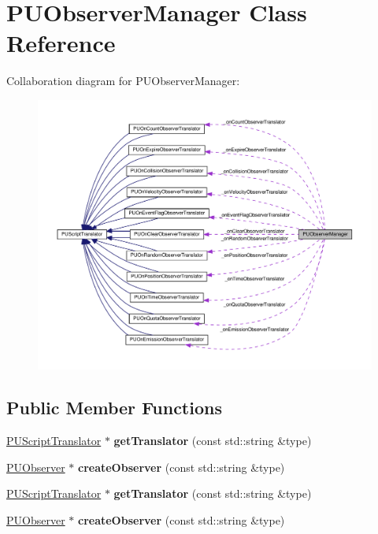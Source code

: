 \hypertarget{classPUObserverManager}{}\section{P\+U\+Observer\+Manager Class Reference}
\label{classPUObserverManager}


Collaboration diagram for P\+U\+Observer\+Manager\+:
\nopagebreak
\begin{figure}[H]
\begin{center}
\leavevmode
\includegraphics[width=350pt]{classPUObserverManager__coll__graph}
\end{center}
\end{figure}
\subsection*{Public Member Functions}
\begin{DoxyCompactItemize}
\item 
\mbox{\label{classPUObserverManager_aeb6c1b3acd7ccd7f2dac67d7642b2cd1}} 
\hyperlink{classPUScriptTranslator}{P\+U\+Script\+Translator} $\ast$ {\bfseries get\+Translator} (const std\+::string \&type)
\item 
\mbox{\label{classPUObserverManager_a5ff3e55046da5b784b27d7372253b676}} 
\hyperlink{classPUObserver}{P\+U\+Observer} $\ast$ {\bfseries create\+Observer} (const std\+::string \&type)
\item 
\mbox{\label{classPUObserverManager_a5205d817bbf02f4215f9c48d083ab878}} 
\hyperlink{classPUScriptTranslator}{P\+U\+Script\+Translator} $\ast$ {\bfseries get\+Translator} (const std\+::string \&type)
\item 
\mbox{\label{classPUObserverManager_a0ddb6e316c9d9c0e6390561166a659e5}} 
\hyperlink{classPUObserver}{P\+U\+Observer} $\ast$ {\bfseries create\+Observer} (const std\+::string \&type)
\end{DoxyCompactItemize}
